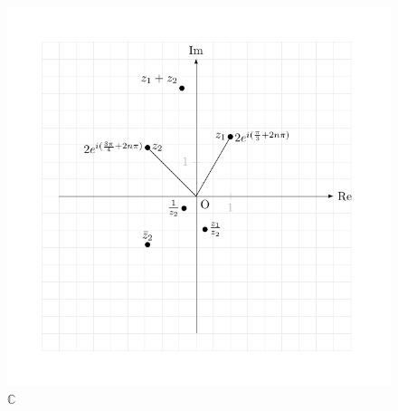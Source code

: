 \documentclass[12pt]{article}
\newcommand{\C}{\mathbb{C}}
\begin{document}
\begin{figure}[!htbp]
    \centering
    \includegraphics[width=1 \linewidth]{test1.pdf}
    \caption{$\C$}
\end{figure}
\end{document}

